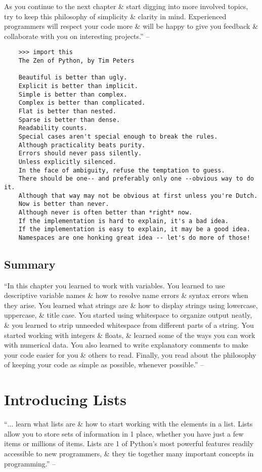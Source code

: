 \documentclass[oneside]{book}
\numberwithin{equation}{section}
\begin{document}
As you continue to the next chapter \& start digging into more involved topics, try to keep this philosophy of simplicity \& clarity in mind. Experienced programmers will respect your code more \& will be happy to give you feedback \& collaborate with you on interesting projects.'' -- \cite[pp. 30--31]{Matthes2019}
\begin{verbatim}
	>>> import this
	The Zen of Python, by Tim Peters
	
	Beautiful is better than ugly.
	Explicit is better than implicit.
	Simple is better than complex.
	Complex is better than complicated.
	Flat is better than nested.
	Sparse is better than dense.
	Readability counts.
	Special cases aren't special enough to break the rules.
	Although practicality beats purity.
	Errors should never pass silently.
	Unless explicitly silenced.
	In the face of ambiguity, refuse the temptation to guess.
	There should be one-- and preferably only one --obvious way to do it.
	Although that way may not be obvious at first unless you're Dutch.
	Now is better than never.
	Although never is often better than *right* now.
	If the implementation is hard to explain, it's a bad idea.
	If the implementation is easy to explain, it may be a good idea.
	Namespaces are one honking great idea -- let's do more of those!
\end{verbatim}

\subsection{Summary}
``In this chapter you learned to work with variables. You learned to use descriptive variable names \& how to resolve name errors \& syntax errors when they arise. You learned what strings are \& how to display strings using lowercase, uppercase, \& title case. You started using whitespace to organize output neatly, \& you learned to strip unneeded whitespace from different parts of a string. You started working with integers \& floats, \& learned some of the ways you can work with numerical data. You also learned to write explanatory comments to make your code easier for you \& others to read. Finally, you read about the philosophy of keeping your code as simple as possible, whenever possible.'' -- \cite[p. 32]{Matthes2019}


\section{Introducing Lists}
``$\ldots$ learn what lists are \& how to start working with the elements in a list. Lists allow you to store sets of information in 1 place, whether you have just a few items or millions of items. Lists are 1 of Python's most powerful features readily accessible to new programmers, \& they tie together many important concepts in programming.'' -- \cite[p. 33]{Matthes2019}
\end{document}
